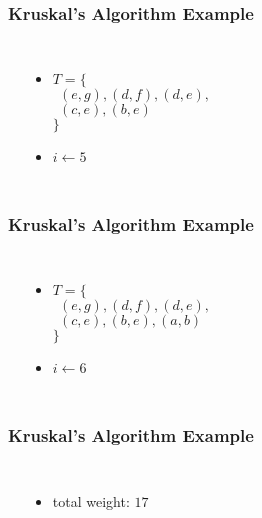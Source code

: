 \documentclass[dvipsnames]{beamer}
\begin{document}
\begin{frame}
  \frametitle{Kruskal's Algorithm Example}

  \begin{example}[$4 < 6$]
    \begin{columns}
      \begin{center}
      \end{center}

      \pause
      \begin{itemize}
        \item $T = \{$\\
          $~~(e,g), (d,f), (d,e),$\\
          $~~(c,e), (b,e)$\\
          $\}$
        \item $i \leftarrow 5$
      \end{itemize}
    \end{columns}
  \end{example}
\end{frame}

\begin{frame}
  \frametitle{Kruskal's Algorithm Example}

  \begin{example}[$5 < 6$]
    \begin{columns}
      \begin{center}
      \end{center}

      \pause
      \begin{itemize}
        \item $T = \{$\\
          $~~(e,g), (d,f), (d,e),$\\
          $~~(c,e), (b,e), (a,b)$\\
          $\}$
        \item $i \leftarrow 6$
      \end{itemize}
    \end{columns}
  \end{example}
\end{frame}

\begin{frame}
  \frametitle{Kruskal's Algorithm Example}

  \begin{example}[$6 \nless 6$]
    \begin{columns}
      \begin{center}
      \end{center}

      \begin{itemize}
        \item total weight: $17$
      \end{itemize}
    \end{columns}
  \end{example}
\end{frame}
\end{document}
